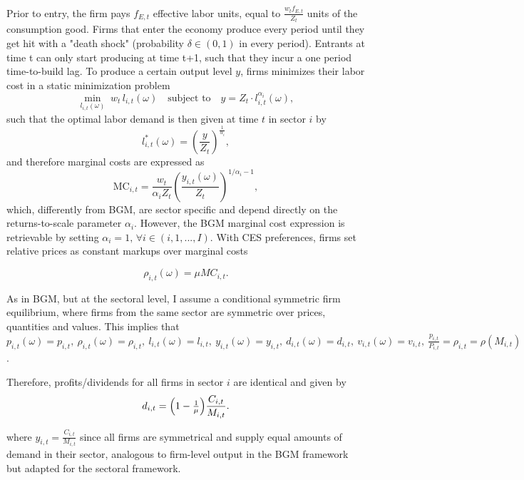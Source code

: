 \documentclass[a4paper,12pt]{article} %
\numberwithin{equation}{section} %
\numberwithin{figure}{section}
\numberwithin{table}{section}
\begin{document}
Prior to entry, the firm pays $f_{E,t}$ effective labor units, equal to $\frac{w_tf_{E,t}}{Z_t}$ units of the consumption good. 
Firms that enter the economy produce every period until they get hit with a "death shock" (probability $\delta \in (0,1)$ in every period). 
Entrants at time t can only start producing at time t+1, such that they incur a one period time-to-build lag. 
To produce a certain output level $y$, firms minimizes their labor cost in a static minimization problem
\[
    \min_{l_{i,t}(\omega)} \; w_t\,l_{i,t}(\omega) \quad \text{subject to} \quad y = Z_t \cdot l_{i,t}^{\alpha_i}(\omega),
\]
such that the optimal labor demand is then given at time $t$ in sector $i$ by 
\begin{equation}
  l_{i,t}^*(\omega) = \left(\frac{y}{Z_t}\right)^{\frac{1}{\alpha_i}},\label{eq:labourClearing}
\end{equation}
and therefore marginal costs are expressed as
\begin{equation}
  \text{MC}_{i,t} = \frac{w_t}{\alpha_i Z_t}\left(\frac{y_{i,t}(\omega)}{Z_t}\right)^{\!1/\alpha_i-1},\label{eq:marginalcost}
\end{equation}
which, differently from BGM, are sector specific and depend directly on the returns-to-scale parameter $\alpha_i$. However, the BGM
marginal cost expression is retrievable by setting $\alpha_i = 1, \, \forall i \in (i,1,...,I)$. With CES preferences, firms set relative
prices as constant markups over marginal costs 

\begin{equation}
  \rho_{i,t}(\omega) = \mu MC_{i,t}.\label{eq:pricing}
\end{equation}

As in BGM, but at the sectoral level, I assume a conditional symmetric firm equilibrium, where firms from the same sector 
are symmetric over prices, quantities and values. 
This implies that $p_{i,t}(\omega) = p_{i,t}, \ \rho_{i,t}(\omega) = \rho_{i,t}   , \   l_{i,t}(\omega) = l_{i,t}   , 
\  y_{i,t}(\omega) = y_{i,t}   , \  d_{i,t}(\omega) = d_{i,t}   ,  \ v_{i,t}(\omega) = v_{i,t}   , \  
\frac{p_{i,t}}{P_{i,t}} = \rho_{i,t} = \rho(M_{i,t})$. 

Therefore, profits/dividends for all firms in sector $i$ are identical and given by
\begin{equation}
  d_{i,t} = \Bigl(1-\tfrac1\mu\Bigr)\frac{C_{i,t}}{M_{i,t}}. \label{eq:profit}
\end{equation}

where $y_{i,t} = \frac{C_{i,t}}{M_{i,t}}$ since all firms are symmetrical and supply equal amounts of demand in their sector, analogous to firm-level
output in the BGM framework but adapted for the sectoral framework.
\end{document}
